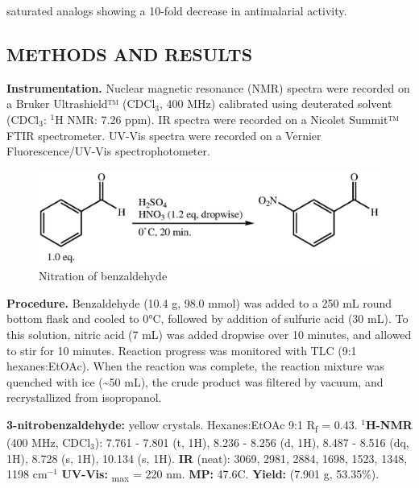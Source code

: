 \documentclass[12pt]{article}
\let\bf\textbf
\begin{document}
saturated analogs showing a 10-fold decrease in antimalarial activity.\cite{Li1995}
\subsection*{METHODS AND RESULTS}
\bf{Instrumentation.} Nuclear magnetic resonance (NMR) spectra were recorded on a Bruker Ultrashield™ (CDCl$_3$, 400 MHz) calibrated using deuterated solvent (CDCl$_3$: $^1$H NMR: 7.26 ppm). IR spectra were recorded on a Nicolet Summit™ FTIR spectrometer. UV-Vis spectra were recorded on a Vernier Fluorescence/UV-Vis spectrophotometer.

\begin{figure}[H]
    \centering
    \includegraphics[scale=0.8]{schemes/nitration.eps}
    \caption{Nitration of benzaldehyde}
\end{figure}
\bf{Procedure.} Benzaldehyde (10.4 g, 98.0 mmol) was added to a 250 mL round bottom flask and cooled to 0°C, followed by addition of sulfuric acid (30 mL). To this solution, nitric acid (7 mL) was added dropwise over 10 minutes, and allowed to stir for 10 minutes. Reaction progress was monitored with TLC (9:1 hexanes:EtOAc). When the reaction was complete, the reaction mixture was quenched with ice (\textasciitilde 50 mL), the crude product was filtered by vacuum, and recrystallized from isopropanol.

\noindent\bf{3-nitrobenzaldehyde:} yellow crystals. Hexanes:EtOAc 9:1 R\textsubscript{f} = 0.43. \bf{$^1$H-NMR} (400 MHz, CDCl$_3$): \textdelta\hspace{0mm} 7.761 - 7.801 (t, 1H), 8.236 - 8.256 (d, 1H), 8.487 - 8.516 (dq, 1H), 8.728 (s, 1H), 10.134 (s, 1H). \bf{IR} (neat): 3069, 2981, 2884, 1698, 1523, 1348, 1198 cm$^{-1}$ \bf{UV-Vis:} \textlambda\textsubscript{max} = 220 nm. \bf{MP:} 47.6\degree C. \bf{Yield:} (7.901 g, 53.35\%).
\end{document}
